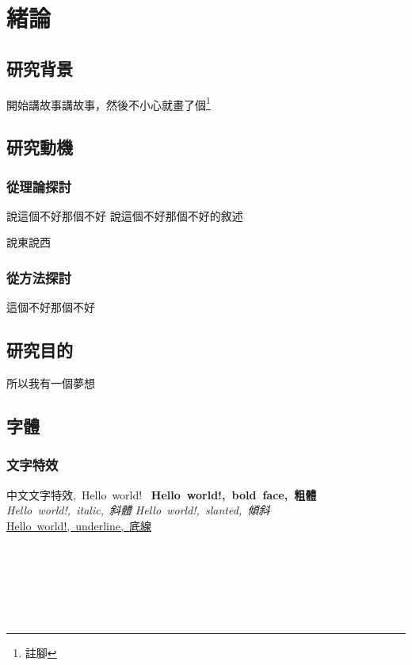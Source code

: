 
\chapter{緒論}

\section{研究背景}
開始講故事講故事，然後不小心就畫了個\footnote{註腳}


\section{研究動機}

\subsection{從理論探討}
\textcite{doublepeason} 說這個不好那個不好
說這個不好那個不好的敘述\parencite{doublepeason}

\textcite{haha}

\textcite{doublepeason} 說東說西

\subsection{從方法探討}
這個不好那個不好

\section{研究目的}
所以我有一個夢想

\newpage

\section{字體}
\subsection{文字特效}
\hbox{中文文字特效, Hello world!}
{\LARGE
    \hbox{\textbf{ Hello world!, bold face, 粗體}}
    \hbox{\textit{Hello world!, italic, 斜體}}
    \hbox{\textsl{Hello world!, slanted, 傾斜}}
    \hbox{\underline{Hello world!, underline, 底線}}
}

\\
\\
\\
\\
\\


